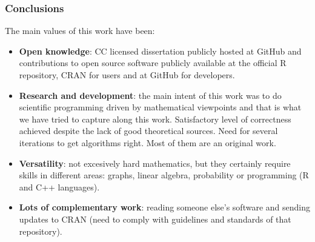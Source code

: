 \begin{frame}\frametitle{Conclusions}
 \vspace{2em}\fontsize{10pt}{0}\selectfont
 The main values of this work have been:
 \begin{itemize}
  \item \textbf{Open knowledge}: CC licensed dissertation publicly hosted at GitHub and contributions to open source software publicly available at the official R repository, CRAN for users and at GitHub for developers.

  \item \textbf{Research and development}: the main intent of this work was to do scientific programming driven by mathematical viewpoints and that is what we have tried to capture along this work. Satisfactory level of correctness achieved despite the lack of good theoretical sources. Need for several iterations to get algorithms right. Most of them are an original work.

  \item \textbf{Versatility}: not excesively hard mathematics, but they certainly require skills in different areas: graphs, linear algebra, probability or programming (R and C++ languages).

  \item \textbf{Lots of complementary work}: reading someone else's software and sending updates to CRAN (need to comply with guidelines and standards of that repository).
 \end{itemize}
\end{frame}
